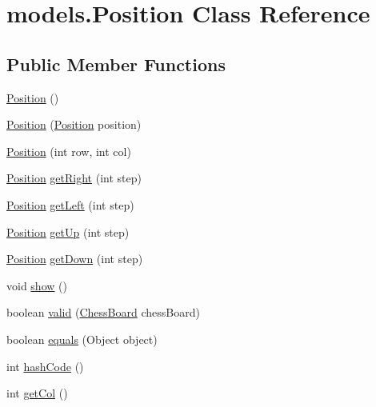 \hypertarget{classmodels_1_1_position}{\section{models.\+Position Class Reference}
\label{classmodels_1_1_position}
}
\subsection*{Public Member Functions}
\begin{DoxyCompactItemize}
\item 
\hyperlink{classmodels_1_1_position_ae70489b2d6b4738da8a2018e61634a6d}{Position} ()
\item 
\hyperlink{classmodels_1_1_position_ac71bfa61225c295e8554e9f22858e105}{Position} (\hyperlink{classmodels_1_1_position}{Position} position)
\item 
\hyperlink{classmodels_1_1_position_a3ca0f8a082cd6da56549403397facdbf}{Position} (int row, int col)
\item 
\hyperlink{classmodels_1_1_position}{Position} \hyperlink{classmodels_1_1_position_a15c414693b69ee5685697faa77b35247}{get\+Right} (int step)
\item 
\hyperlink{classmodels_1_1_position}{Position} \hyperlink{classmodels_1_1_position_af6beee2dd50788597e1ee1a44854bdd7}{get\+Left} (int step)
\item 
\hyperlink{classmodels_1_1_position}{Position} \hyperlink{classmodels_1_1_position_af2c7aeae4f0c5cf9d9c752020fada35a}{get\+Up} (int step)
\item 
\hyperlink{classmodels_1_1_position}{Position} \hyperlink{classmodels_1_1_position_a5edb65a1f0e1e83b116ec155315da33a}{get\+Down} (int step)
\item 
void \hyperlink{classmodels_1_1_position_ad0778a05537f93acd82e31a6d053e380}{show} ()
\item 
boolean \hyperlink{classmodels_1_1_position_af999cad6749ec695abed16c2f4404370}{valid} (\hyperlink{classmodels_1_1_chess_board}{Chess\+Board} chess\+Board)
\item 
boolean \hyperlink{classmodels_1_1_position_a25c38e3b3fbdf544b88dc328aceb0aad}{equals} (Object object)
\item 
int \hyperlink{classmodels_1_1_position_ae8e5288bb6a72118ef901adb7e70e756}{hash\+Code} ()
\item 
int \hyperlink{classmodels_1_1_position_ae3739c95264be83590bdd5cc8800f5c3}{get\+Col} ()
\end{DoxyCompactItemize}


